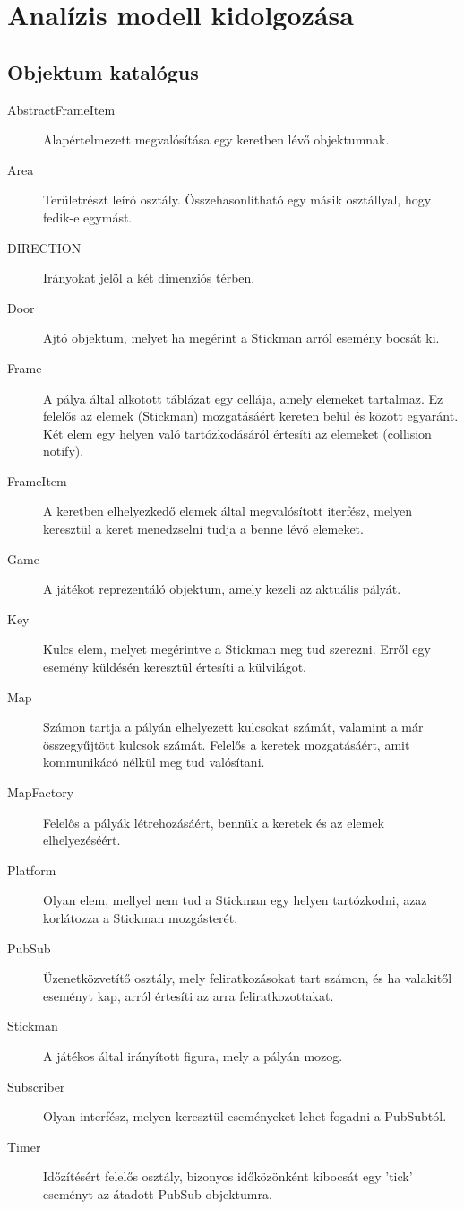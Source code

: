 



\fedlap

\addtocounter{section}{3}
\section{Analízis modell kidolgozása}

	\subsection{Objektum katalógus}
		\begin{description}
			\item[AbstractFrameItem] Alapértelmezett megvalósítása egy keretben lévő objektumnak.
			\item[Area] Területrészt leíró osztály. Összehasonlítható egy másik osztállyal, hogy fedik-e egymást.
			\item[DIRECTION] Irányokat jelöl a két dimenziós térben.
			\item[Door] Ajtó objektum, melyet ha megérint a Stickman arról esemény bocsát ki.
			\item[Frame] A pálya által alkotott táblázat egy cellája, amely elemeket tartalmaz. Ez felelős az elemek (Stickman) mozgatásáért kereten belül és között egyaránt. Két elem egy helyen való tartózkodásáról értesíti az elemeket (collision notify).
			\item[FrameItem] A keretben elhelyezkedő elemek által megvalósított iterfész, melyen keresztül a keret menedzselni tudja a benne lévő elemeket.
			\item[Game] A játékot reprezentáló objektum, amely kezeli az aktuális pályát.
			\item[Key] Kulcs elem, melyet megérintve a Stickman meg tud szerezni. Erről egy esemény küldésén keresztül értesíti a külvilágot.
			\item[Map] Számon tartja a pályán elhelyezett kulcsokat számát, valamint a már összegyűjtött kulcsok számát. Felelős a keretek mozgatásáért, amit kommunikácó nélkül meg tud valósítani.
			\item[MapFactory] Felelős a pályák létrehozásáért, bennük a keretek és az elemek elhelyezéséért.
			\item[Platform] Olyan elem, mellyel nem tud a Stickman egy helyen tartózkodni, azaz korlátozza a Stickman mozgásterét.
			\item[PubSub] Üzenetközvetítő osztály, mely feliratkozásokat tart számon, és ha valakitől eseményt kap, arról értesíti az arra feliratkozottakat.
			\item[Stickman] A játékos által irányított figura, mely a pályán mozog.
			\item[Subscriber] Olyan interfész, melyen keresztül eseményeket lehet fogadni a PubSubtól.
			\item[Timer] Időzítésért felelős osztály, bizonyos időközönként kibocsát egy 'tick' eseményt az átadott PubSub objektumra.
		\end{description}
	
